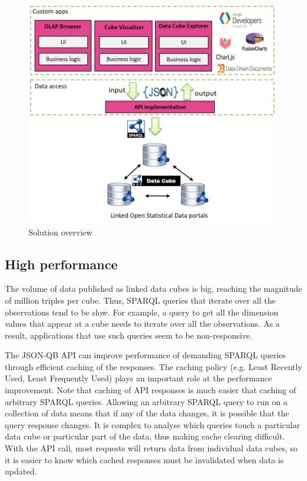 \documentclass{llncs}
\begin{document}
\begin{figure}[h!]
  \includegraphics[width=110mm]{images/overview.jpg}
\caption{Solution overview}
\label{fig:overview}
\end{figure}

\subsection{High performance}

The volume of data published as linked data cubes is big, reaching the magnitude of million triples per cube. Thus, SPARQL queries that iterate over all the observations tend to be slow. For example, a query to get all the dimension values that appear at a cube needs to iterate over all the observations. As a result, applications that use such queries seem to be non-responsive. 

The JSON-QB API can improve performance of demanding SPARQL queries through efficient caching of the responses. The caching policy (e.g. Least Recently Used, Least Frequently Used) plays an important role at the performance improvement. Note that caching of API responses is much easier that caching of arbitrary SPARQL queries. Allowing an arbitrary SPARQL query to run on a collection of data means that if any of the data changes, it is possible that the query response changes.  It is complex to analyse which queries touch a particular data cube or particular part of the data, thus making cache clearing difficult.  With the API call, most requests will return data from individual data cubes, so it is easier to know which cached responses must be invalidated when data is updated.
\end{document}
